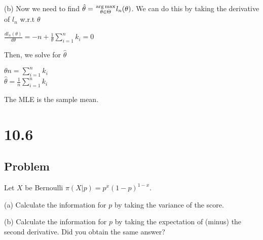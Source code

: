 \documentclass[10pt, a4paper]{article}
\DeclareMathOperator*{\argmax}{arg\,max}
\begin{document}
      (b) Now we need to find $\hat \theta={\argmax\atop{\theta\in\Theta}}l_n(\theta)$. We can do this by taking the derivative of $l_n$ w.r.t $\theta$ 
      \begin{center}
        $\frac{dl_n(\theta)}{d\theta} = -n + \frac{1}{\theta}\sum_{i=1}^n k_i=0$ \\
      \end{center}

      Then, we solve for $\hat\theta$
      \begin{center}
        $\theta n = \sum_{i=1}^n k_i$ \\
        $\boxed{\hat\theta = \frac{1}{n}\sum_{i=1}^n k_i}$
      \end{center}
      \begin{*align}

      The MLE is the sample mean.
    

  \section*{10.6}
    \subsection*{Problem}
      Let $X$ be Bernoulli $\pi(X|p)=p^x(1-p)^{1-x}$.

      (a) Calculate the information for $p$ by taking the variance of the score.

      (b) Calculate the information for $p$ by taking the expectation of (minus) the second derivative. Did you obtain the same answer? 

\end{*align}
\end{document}
